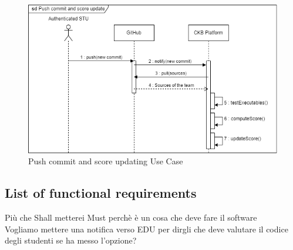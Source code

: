 \begin{figure}[H]
    \centering
    \includegraphics[width=1\textwidth]{images/sequence_diagrams/ClassDiagram-UC18-SequenceDiagram.png}
    \caption{Push commit and score updating Use Case}
    \label{fig:uc18}
\end{figure}

\subsection{List of functional requirements}

{\color{red} 
    Più che Shall metterei Must perchè è un cosa che deve fare il software \\
    Vogliamo mettere una notifica verso EDU per dirgli che deve valutare il codice degli studenti se ha messo l'opzione? 
} \\

